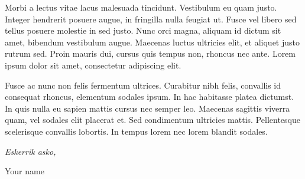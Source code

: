 \begin{acknowledgements}
Morbi a lectus vitae lacus malesuada tincidunt. Vestibulum eu quam justo. Integer hendrerit posuere augue, in fringilla nulla feugiat ut. Fusce vel libero sed tellus posuere molestie in sed justo. Nunc orci magna, aliquam id dictum sit amet, bibendum vestibulum augue. Maecenas luctus ultricies elit, et aliquet justo rutrum sed. Proin mauris dui, cursus quis tempus non, rhoncus nec ante. Lorem ipsum dolor sit amet, consectetur adipiscing elit.

Fusce ac nunc non felis fermentum ultrices. Curabitur nibh felis, convallis id consequat rhoncus, elementum sodales ipsum. In hac habitasse platea dictumst. In quis nulla eu sapien mattis cursus nec semper leo. Maecenas sagittis viverra quam, vel sodales elit placerat et. Sed condimentum ultricies mattis. Pellentesque scelerisque convallis lobortis. In tempus lorem nec lorem blandit sodales. 


\begin{flushright}
\textit{Eskerrik asko,}

Your name

\monthname \ \the\year







\end{flushright}



\end{acknowledgements}



